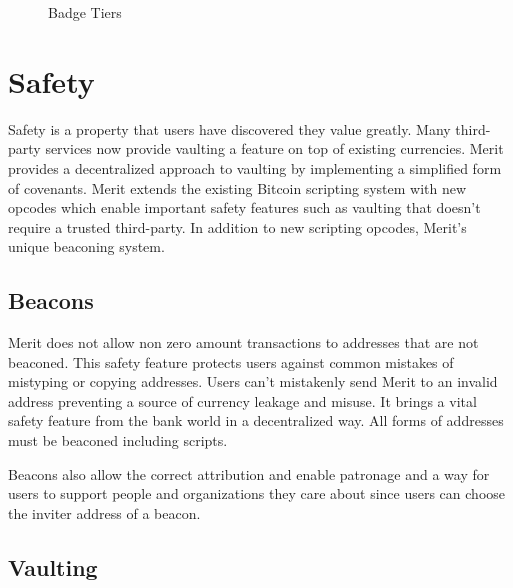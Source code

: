 \documentclass{article}
\begin{document}
\begin{figure}[H]
    \begin{center}
    \end{center}
    \caption{Badge Tiers}
\end{figure}


\section{Safety}

Safety is a property that users have discovered they value greatly. Many third-party
services now provide vaulting a feature on top of existing currencies. Merit
provides a decentralized approach to vaulting by implementing a simplified form
of covenants. Merit extends the existing Bitcoin scripting system with new
opcodes which enable important safety features such as vaulting that doesn't
require a trusted third-party. In addition to new scripting opcodes, Merit's
unique beaconing system.

\subsection{Beacons}

Merit does not allow non zero amount transactions to addresses that are not beaconed.
This safety feature protects users against common mistakes of mistyping or copying
addresses. Users can't mistakenly send Merit to an invalid address preventing
a source of currency leakage and misuse. It brings a vital safety feature
from the bank world in a decentralized way. All forms of addresses must be
beaconed including scripts.

Beacons also allow the correct attribution and enable patronage and a way for users
to support people and organizations they care about since users can choose the
inviter address of a beacon. 

\subsection{Vaulting}
\end{document}
